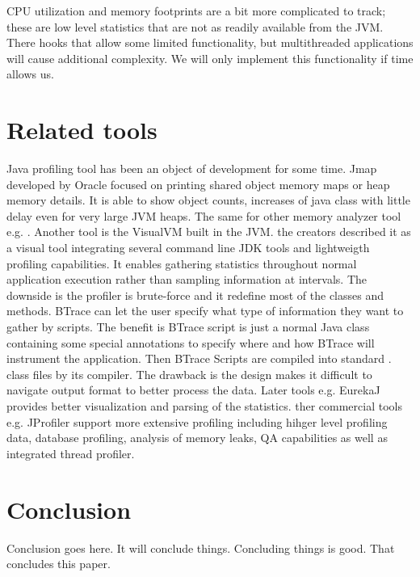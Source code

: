 \documentclass{article}
\begin{document}
CPU utilization and memory footprints are a bit more complicated to track; these are low level statistics that are not as readily available from the JVM.
There hooks that allow some limited functionality, but multithreaded applications will cause additional complexity.
We will only implement this functionality if time allows us.

\section{Related tools}

Java profiling tool has been an object of development for some time.
Jmap \cite{Oraclejmap} developed by Oracle focused on printing shared object memory maps or heap memory details.
It is able to show object counts, increases of java class with little delay even for very large JVM heaps.
The same for other memory analyzer tool e.g. \cite{MAT}.
Another tool is the VisualVM \cite{VisualVM} built in the JVM.
the creators described it as a visual tool integrating several command line JDK tools and lightweigth profiling capabilities.
It enables gathering statistics throughout normal application execution rather than sampling information at intervals.
The downside is the profiler is brute-force and it redefine most of the classes and methods.
BTrace \cite{BTrace} can let the user specify what type of information they want to gather by scripts.
The benefit is BTrace script is just a normal Java class containing some special annotations to specify where and how BTrace will instrument the application.
Then BTrace Scripts are compiled into standard .
class files by its compiler.
The drawback is the design makes it difficult to navigate output format to better process the data.
Later tools e.g. EurekaJ \cite{EurekaJ} provides better visualization and parsing of the statistics.
ther commercial tools e.g. JProfiler \cite{JProfiler} support more extensive profiling including hihger level profiling data, database profiling, analysis of memory leaks, QA capabilities as well as integrated thread profiler.

\section{Conclusion}
Conclusion goes here.
It will conclude things.
Concluding things is good.
That concludes this paper.




\end{document}
